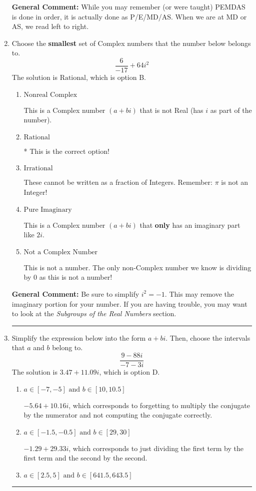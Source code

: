 \documentclass{extbook}[14pt]
\newcommand{\litem}[1]{\item #1

\rule{\textwidth}{0.4pt}}
\begin{document}
\begin{enumerate}
{\textbf{General Comment:} While you may remember (or were taught) PEMDAS is done in order, it is actually done as P/E/MD/AS. When we are at MD or AS, we read left to right.
}
\litem{
Choose the \textbf{smallest} set of Complex numbers that the number below belongs to.
\[ \frac{6}{-17}+64i^2 \]The solution is \( \text{Rational} \), which is option B.\begin{enumerate}[label=\Alph*.]
\item \( \text{Nonreal Complex} \)

This is a Complex number $(a+bi)$ that is not Real (has $i$ as part of the number).
\item \( \text{Rational} \)

* This is the correct option!
\item \( \text{Irrational} \)

These cannot be written as a fraction of Integers. Remember: $\pi$ is not an Integer!
\item \( \text{Pure Imaginary} \)

This is a Complex number $(a+bi)$ that \textbf{only} has an imaginary part like $2i$.
\item \( \text{Not a Complex Number} \)

This is not a number. The only non-Complex number we know is dividing by 0 as this is not a number!
\end{enumerate}

\textbf{General Comment:} Be sure to simplify $i^2 = -1$. This may remove the imaginary portion for your number. If you are having trouble, you may want to look at the \textit{Subgroups of the Real Numbers} section.
}
\litem{
Simplify the expression below into the form $a+bi$. Then, choose the intervals that $a$ and $b$ belong to.
\[ \frac{9 - 88 i}{-7 - 3 i} \]The solution is \( 3.47  + 11.09 i \), which is option D.\begin{enumerate}[label=\Alph*.]
\item \( a \in [-7, -5] \text{ and } b \in [10, 10.5] \)

 $-5.64  + 10.16 i$, which corresponds to forgetting to multiply the conjugate by the numerator and not computing the conjugate correctly.
\item \( a \in [-1.5, -0.5] \text{ and } b \in [29, 30] \)

 $-1.29  + 29.33 i$, which corresponds to just dividing the first term by the first term and the second by the second.
\item \( a \in [2.5, 5] \text{ and } b \in [641.5, 643.5] \)


\end{enumerate}}
\end{enumerate}
\end{document}
